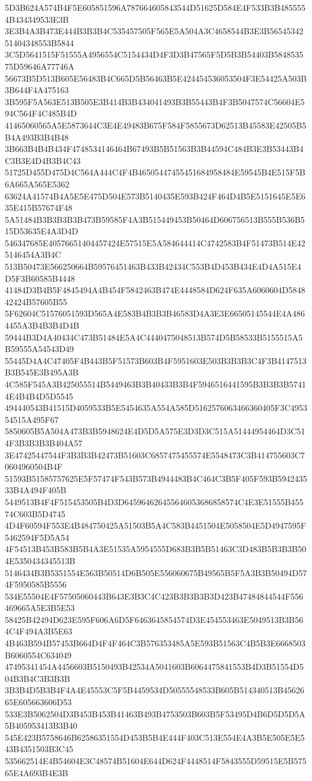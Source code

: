 {{{{{{{{{{{{{{{{{{{{{5D3B624A574B4F5E605851596A787664605843544D51625D584E4F533B3B4855554B434349533E3B
3E3B4A3B473E444B3B3B4C535457505F565E5A504A3C4658544B3E3B5654534251404348553B5844
3C5D5641515F51555A4956554C5154434D4F3D3B47565F5D5B3B54403B584853575D59646A77746A
56673B5D513B605E56483B4C665D5B56463B5E424454536053504F3E54425A503B3B644F4A475163
3B595F5A563E513B505E3B414B3B434041493B3B55443B4F3B5047574C56604E594C564F4C485B4D
41465060565A5E5873644C3E4E49483B675F584F5855673D62513B45583E42505B5B4A493B3B4B48
3B663B4B4B434F4748534146464B67493B5B51563B3B44594C484B3E3B53443B4C3B3E4D4B3B4C43
51725D455D475D4C564A444C4F4B46505447455451684958484E59545B4E515F5B6A665A565E5362
63624A41574B4A5E5E475D504E573B5140435E593B424F464D4B5E5151645E5E635E415B57674F48
5A51484B3B3B3B3B473B59585F4A3B515449453B50464D606756513B555B536B515D53635E4A3D4D
546347685E40576651404457424E57515E5A584644414C4742583B4F51473B514E425146454A3B4C
513B50473E566250664B59576451463B433B42434C553B4D453B434E4D4A515E4D5F3B60585B4448
41484D3B4B5F4845494A4B454F5842463B474E4448584D624F635A6060604D584842424B57605B55
5F62604C51576051593D565A4E583B4B3B3B46583D4A3E3E66505145544E4A4864455A3B4B3B4D4B
59444B3D4A40434C473B51484E5A4C4440475048513B574D5B58533B5155515A5B59555A54543D49
55445D4A4C47405F4B443B5F51573B603B4F5951603E503B3B3B3C4F3B4147513B3B545E3B495A3B
4C585F545A3B425055514B5449463B3B40433B3B4F5946516441595B3B3B3B57414E4B4B4D5D5545
494440543B41515D4059533B5E5454635A554A585D5162576063466360405F3C495354515A495F67
5850605B5A504A473B3B5948624E4D5D5A575E3D3D3C515A51444954464D3C514F3B3B3B3B404A57
3E47425447544F3B3B3B42473B51603C6857475455574E5548473C3B414755603C70604960504B4F
51593B51585757625E5F57474F543B573B4944483B4C464C3B5F405F593B594243533B4A494F405B
5449513B4F4F515453505B4D3D645964626455646053686858574C4E3E51555B45574C603B5D4745
4D4F60594F553E4B484750425A51503B5A4C583B4451504E5058504E5D4947595F5462594F5D5A54
4F54513B453B583B5B4A3E51535A5954555D683B3B5B51463C3D483B5B3B3B504E5350434345513B
5146434B3B5351554E563B50514D6B505E556060675B49565B5F5A3B3B50494D574F5950585B5556
534E55504E4F57505060443B643E3B3C4C423B3B3B3B3D423B47484844544F556469665A5E3B5E53
58425B42494D623E595F606A6D5F6463645854574D3E454553463E5049513B3B564C4F494A3B5E63
4B463B594B57453B664D4F4F464C3B576353485A5E593B51563C4B5B3E6668503B6060554C634049
47495341454A4456603B5150493B42534A5041603B6064475841553B4D3B51554D504B3B4C3B3B3B
3B3B4D5B3B4F4A4E45553C5F5B4459534D50555548533B605B514340513B4562665E605663606D53
533E3B5062504D3B453B453B41463B493B4753503B603B5F53495D4B6D5D5D5A5B405953413B3B40
545E423B5758646B62586351554D453B5B4E444F403C513E554E4A3B5E505E5E543B4351503B3C45
535662514E4B54604E3C48574B51604E644D624F4448514F5843555D59515E5B57565E4A693B4E3B
}}}}}}}}}}}}}}}}}}}}}
